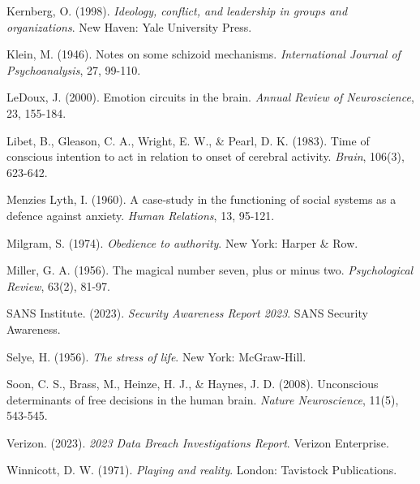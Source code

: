 \documentclass[11pt,a4paper]{article}
\begin{document}
\begin{thebibliography}{99}
Kernberg, O. (1998). \textit{Ideology, conflict, and leadership in groups and organizations}. New Haven: Yale University Press.

Klein, M. (1946). Notes on some schizoid mechanisms. \textit{International Journal of Psychoanalysis}, 27, 99-110.

LeDoux, J. (2000). Emotion circuits in the brain. \textit{Annual Review of Neuroscience}, 23, 155-184.

Libet, B., Gleason, C. A., Wright, E. W., \& Pearl, D. K. (1983). Time of conscious intention to act in relation to onset of cerebral activity. \textit{Brain}, 106(3), 623-642.

Menzies Lyth, I. (1960). A case-study in the functioning of social systems as a defence against anxiety. \textit{Human Relations}, 13, 95-121.

Milgram, S. (1974). \textit{Obedience to authority}. New York: Harper \& Row.

Miller, G. A. (1956). The magical number seven, plus or minus two. \textit{Psychological Review}, 63(2), 81-97.

SANS Institute. (2023). \textit{Security Awareness Report 2023}. SANS Security Awareness.

Selye, H. (1956). \textit{The stress of life}. New York: McGraw-Hill.

Soon, C. S., Brass, M., Heinze, H. J., \& Haynes, J. D. (2008). Unconscious determinants of free decisions in the human brain. \textit{Nature Neuroscience}, 11(5), 543-545.

Verizon. (2023). \textit{2023 Data Breach Investigations Report}. Verizon Enterprise.

Winnicott, D. W. (1971). \textit{Playing and reality}. London: Tavistock Publications.

\end{thebibliography}
\end{document}
